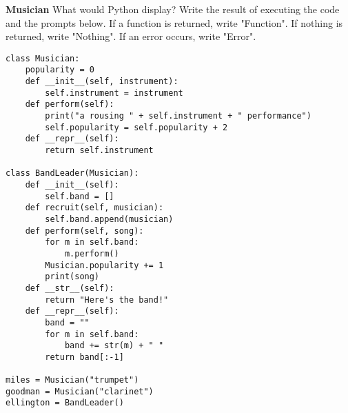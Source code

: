 \begin{blocksection}
\question \textbf{Musician} What would Python display? Write the result of executing the code and the prompts below. If a function is returned, write "Function". If nothing is returned, write "Nothing". If an error occurs, write "Error".

\begin{lstlisting}
class Musician:
    popularity = 0
    def __init__(self, instrument):
        self.instrument = instrument
    def perform(self):
        print("a rousing " + self.instrument + " performance")
        self.popularity = self.popularity + 2
    def __repr__(self):
        return self.instrument

class BandLeader(Musician):
    def __init__(self):
        self.band = []
    def recruit(self, musician):
        self.band.append(musician)
    def perform(self, song):
        for m in self.band:
            m.perform()
        Musician.popularity += 1
        print(song)
    def __str__(self):
        return "Here's the band!"
    def __repr__(self):
        band = ""
        for m in self.band:
            band += str(m) + " "
        return band[:-1]

miles = Musician("trumpet")
goodman = Musician("clarinet")
ellington = BandLeader()
\end{lstlisting}
\end{blocksection}

\newpage

